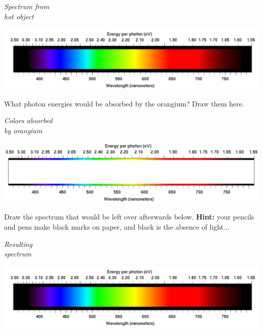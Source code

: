 \documentclass[12pt]{article}
\begin{document}
\begin{minipage}{0.15\textwidth}
	\begin{center}	\it Spectrum from\\
		hot object\end{center}
\end{minipage}
\begin{minipage}{0.8\textwidth}
	\includegraphics[width=5.5in]{spectrum-continuous.png}
\end{minipage}


What photon energies would be absorbed by the orangium? Draw them here.

\begin{minipage}{0.15\textwidth}
	\begin{center}	\it Colors absorbed\\
		by orangium\end{center}
\end{minipage}
\begin{minipage}{0.8\textwidth}
	\includegraphics[width=5.5in]{spectrum-blank.png}
\end{minipage}

Draw the spectrum that would be left over afterwards below. {\bf Hint:} your pencils and pens make black marks on paper, and black is the absence of light...

\begin{minipage}{0.15\textwidth}
	\begin{center}	\it Resulting \\ spectrum\end{center}
\end{minipage}
\begin{minipage}{0.8\textwidth}
	\includegraphics[width=5.5in]{spectrum-continuous.png}
\end{minipage}
\end{document}
